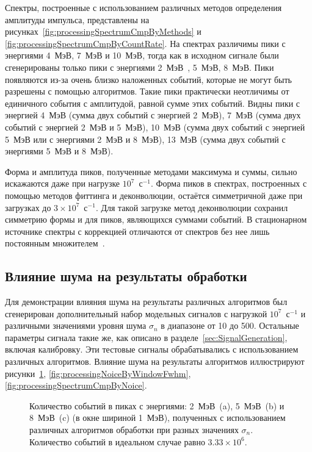 Спектры, построенные с использованием различных методов определения амплитуды импульса, представлены на рисунках~\ref{fig:processingSpectrumCmpByMethods} и \ref{fig:processingSpectrumCmpByCountRate}. На спектрах различимы пики с энергиями 4~МэВ, 7~МэВ и 10~МэВ, тогда как в исходном сигнале были сгенерированы только пики с энергиями 2~МэВ~, 5~МэВ, 8~МэВ. Пики появляются из-за очень близко наложенных событий, которые не могут быть разрешены с помощью алгоритмов. Такие пики практически неотличимы от единичного события с амплитудой, равной сумме этих событий. Видны пики с энергией 4~МэВ (сумма двух событий с энергией 2~МэВ), 7~МэВ (сумма двух событий с энергией 2~МэВ и 5~МэВ), 10~МэВ (сумма двух событий с энергией 5~МэВ или с энергиями 2~МэВ и 8~МэВ), 13~МэВ (сумма двух событий с энергиями 5~МэВ и 8~МэВ).

Форма и амплитуда пиков, полученные методами максимума и суммы, сильно искажаются даже при нагрузке $10^7$~с${}^{-1}$. Форма пиков в спектрах, построенных с помощью методов фиттинга и деконволюции, остаётся симметричной даже при загрузках до $3 \times 10^7$~с${}^{-1}$. Для такой загрузке метод деконволюции сохранил симметрию формы и для пиков, являющихся суммами событий. В стационарном источнике спектры с коррекцией отличаются от спектров без нее лишь постоянным множителем~\cite{Khilkevitch2020}.


\subsection{Влияние шума на результаты обработки}

Для демонстрации влияния шума на результаты различных алгоритмов был сгенерирован дополнительный набор модельных сигналов с нагрузкой $10^7$~с${}^{-1}$ и различными значениями уровня шума $\sigma_n$ в диапазоне от 10 до 500. Остальные параметры сигнала такие же, как описано в разделе~\ref{sec:SignalGeneration}, включая калибровку. Эти тестовые сигналы обрабатывались с использованием различных алгоритмов. Влияние шума на результаты алгоритмов иллюстрируют рисунки~\ref{fig:processingNoiceByWindowCountRate}, \ref{fig:processingNoiceByWindowFwhm}, \ref{fig:processingSpectrumCmpByNoice}.

\begin{figure}[ht!]
  \caption{ Количество событий в пиках с энергиями: 2~МэВ~(a), 5~МэВ~(b) и 8~МэВ~(c) (в окне шириной 1~МэВ), полученных с использованием различных алгоритмов обработки при разных значениях $\sigma_n$. Количество событий в идеальном случае равно $3.33 \times 10^6$.~\cite{Khilkevitch2020} }
  \label{fig:processingNoiceByWindowCountRate}
\end{figure}



